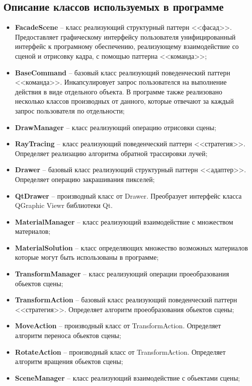 \subsection{Описание классов используемых в программе}
\begin{itemize}
	\item \textbf{FacadeScene} -- класс реализующий структурный паттерн <<фасад>>. Предоставляет графическому интерфейсу пользователя унифицированный интерфейс к програмному обеспечению, реализующему взаимодействие со сценой и отрисовку кадра, с помощью паттерна <<команда>>;
	\item \textbf{BaseCommand} -- базовый класс реализующий поведенческий паттерн <<команда>>. Инкапсулировует запрос пользователся на выполнение действия в виде отдельного объекта. В программе также реализовано несколько классов производных от данного, которые отвечают за каждый запрос пользователя по отдельности;
	\item \textbf{DrawManager} -- класс реализующий операцию отрисовки сцены;
	\item \textbf{RayTracing} -- класс реализующий поведенческий паттерн <<стратегия>>. Определяет реализацию алгоритма обратной трассировки лучей;
	\item \textbf{Drawer} -- базовый класс реализующий структурный паттерн <<адаптер>>. Определяет операцию закрашивания пикселей;
	\item \textbf{QtDrawer} -- производный класс от Drawer. Преобразует интерфейс класса QGraphic Viewr библиотеки Qt.
	\item \textbf{MaterialManager} -- класс реализующий взаимодействие с множеством материалов;
	\item \textbf{MaterialSolution} -- класс определяющих множество возможных материалов которые могут быть использованы в программе;
	\item \textbf{TransformManager} -- класс реализующий операции проеобразования обьектов сцены;
	\item \textbf{TransformAction} -- базовый класс реализующий поведенческий паттерн <<стратегия>>. Определяет алгоритм проеобразования обьектов сцены;
	\item \textbf{MoveAction} -- производный класс от TransformAction. Определяет алгоритм переноса обьектов сцены;
	\item \textbf{RotateAction} -- производный класс от TransformAction. Определяет алгоритм вращения обьектов сцены;
	\item \textbf{SceneManager} -- класс реализующий взаимодействие с обьектами сцены;

\end{itemize}
